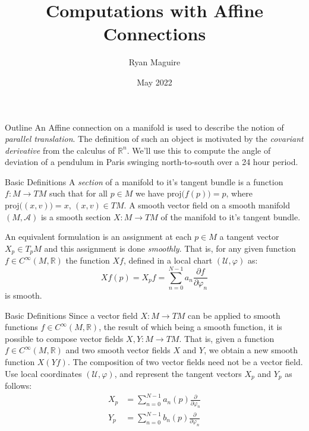 \documentclass{beamer}
\title{Computations with Affine Connections}
\author{Ryan Maguire}
\date{May 2022}
\begin{document}
    \maketitle
    \begin{frame}{Outline}
        An Affine connection on a manifold is used to describe the notion of
        \textit{parallel translation}. The definition of such an object is
        motivated by the \textit{covariant derivative} from the calculus of
        $\mathbb{R}^{n}$. We'll use this to compute the angle of deviation of
        a pendulum in Paris swinging north-to-south over a 24 hour period.
    \end{frame}
    \begin{frame}{Basic Definitions}
        A \textit{section} of a manifold to it's tangent bundle is a function
        $f:M\rightarrow{TM}$ such that for all $p\in{M}$ we have
        $\textrm{proj}\big(f(p)\big)=p$, where
        $\textrm{proj}\big((x,v)\big)=x$, $(x,v)\in{TM}$.
        A smooth vector field on a smooth manifold $(M,\mathcal{A})$ is a smooth
        section $X:M\rightarrow{TM}$ of the manifold to it's tangent bundle.
        \par\hfill\par
        An equivalent formulation is an assignment at each $p\in{M}$ a
        tangent vector $X_{p}\in{T}_{p}M$ and this assignment is done
        \textit{smoothly}. That is, for any given function
        $f\in{C}^{\infty}(M,\mathbb{R})$ the function $Xf$, defined in a
        local chart $(\mathcal{U},\varphi)$ as:
        \begin{equation}
            Xf(p)=X_{p}f
                =\sum_{n=0}^{N-1}a_{n}\frac{\partial{f}}{\partial\varphi_{n}}
        \end{equation}
        is smooth.
    \end{frame}
    \begin{frame}{Basic Definitions}
        Since a vector field $X:M\rightarrow{TM}$ can be applied to smooth
        functions $f\in{C}^{\infty}(M,\mathbb{R})$, the result of which being
        a smooth function, it is possible to compose vector fields
        $X,Y:M\rightarrow{TM}$. That is, given a function
        $f\in{C}^{\infty}(M,\mathbb{R})$ and two smooth vector fields $X$ and
        $Y$, we obtain a new smooth function $X(Yf)$. The composition of two
        vector fields need not be a vector field. Use local
        coordinates $(\mathcal{U},\varphi)$, and represent the tangent
        vectors $X_{p}$ and $Y_{p}$ as follows:
        \begin{align}
            X_{p}&=\sum_{n=0}^{N-1}a_{n}(p)\frac{\partial}{\partial\varphi_{n}}\\
            Y_{p}&=\sum_{n=0}^{N-1}b_{n}(p)\frac{\partial}{\partial\varphi_{n}}
        \end{align}
    \end{frame}
\end{document}
